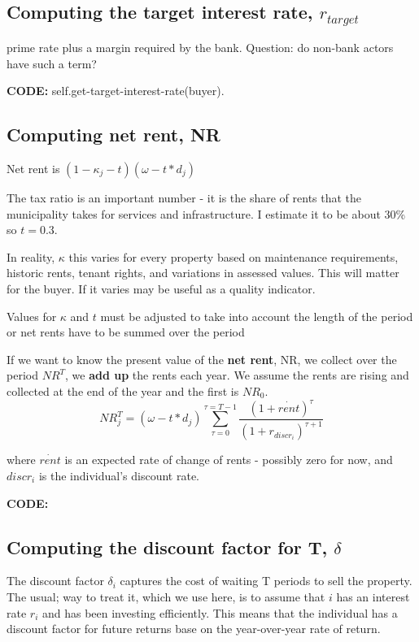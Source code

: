 \subsection{Computing the target interest rate, $r_{target}$}
prime rate plus a margin required by the bank.  Question: do non-bank actors have such a term?

\textbf{CODE:}   self.get-target-interest-rate(buyer).


\subsection{Computing net rent, NR}
Net rent is $(1-\kappa_j - t) (\omega-t*d_j)$


The tax ratio is an important number - it is the share of rents that the municipality takes for services and infrastructure. I estimate it to be about 30\% so $t=0.3$.


In reality, $\kappa$ this varies for every property based on maintenance requirements, historic rents, tenant rights, and variations in assessed values. This will matter for the buyer. If it varies may be useful as a quality indicator.

Values for $\kappa$ and $t$ must be adjusted to take into account the length of the period or net rents have to be summed over the period


If we want to know the  present value  of the \textbf{net rent}, NR, we collect over the period  $NR^T$, we \textbf{add up} the rents each year. We  assume the rents are rising and  collected at the end of the year and the first is $NR_0$.
\[NR_j^T= (\omega-t*d_j)\sum_{\tau=0}^{\tau=T-1} \frac{(1+\dot{rent})^{\tau}} {(1+r_{discr_i})^{\tau+1}} \]

where $\dot{rent}$ is an expected rate of change of rents - possibly zero for now, and $discr_i$ is the individual's discount rate.



\textbf{CODE:}  

\subsection{Computing the discount factor for T, $\delta$}
The discount factor $\delta_i$ captures the cost of waiting T periods to sell the property. The usual; way to treat it, which we use here, is to assume that $i$ has an interest rate $r_i$ and has been investing efficiently. This means that  the individual has a discount factor for future returns base on the year-over-year rate of return. 

